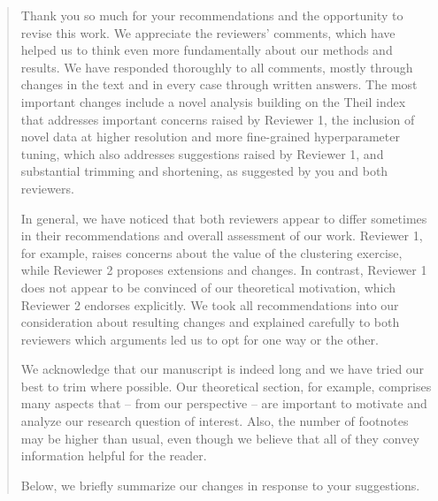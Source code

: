 \documentclass[11pt]{article}
\newenvironment{response}
{\begin{quote}\color{black}}
{\end{quote}}
\begin{document}
\begin{response}
    Thank you so much for your recommendations and the opportunity to revise this work. We appreciate the reviewers' comments, which have helped us to think even more fundamentally about our methods and results. We have responded thoroughly to all comments, mostly through changes in the text and in every case through written answers. The most important changes include a novel analysis building on the Theil index that addresses important concerns raised by Reviewer 1, the inclusion of novel data at higher resolution and more fine-grained hyperparameter tuning, which also addresses suggestions raised by Reviewer 1, and substantial trimming and shortening, as suggested by you and both reviewers.

    In general, we have noticed that both reviewers appear to differ sometimes in their recommendations and overall assessment of our work. Reviewer 1, for example, raises concerns about the value of the clustering exercise, while Reviewer 2 proposes extensions and changes. In contrast, Reviewer 1 does not appear to be convinced of our theoretical motivation, which Reviewer 2 endorses explicitly. We took all recommendations into our consideration about resulting changes and explained carefully to both reviewers which arguments led us to opt for one way or the other.

    We acknowledge that our manuscript is indeed long and we have tried our best to trim where possible. Our theoretical section, for example, comprises many aspects that -- from our perspective -- are important to motivate and analyze our research question of interest. Also, the number of footnotes may be higher than usual, even though we believe that all of they convey information helpful for the reader.

    Below, we briefly summarize our changes in response to your suggestions.
    
\end{response}
\end{document}
